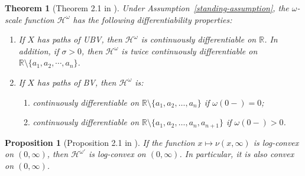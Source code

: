 \documentclass[11pt,reqno]{amsart}
\newtheorem{theorem}{Theorem}[section]
\newtheorem{proposition}{Proposition}[section]
\newtheorem{remark}{Remark}[section]
\newcommand{\reals}{\mathbb{R}}
\newcommand{\ind}{\mathbf{1}}
\newcommand{\cH}{\mathcal{H}}
\renewcommand{\geq}{\geqslant}
\begin{document}
\begin{theorem}[Theorem 2.1 in \cite{mata-renaud_2024}]\label{thm:solution-integral-eq}
	Under Assumption~\ref{standing-assumption}, the $\omega$-scale function $\cH^{\omega}$ has the following differentiability properties:
	\begin{enumerate}
		\item If $X$ has paths of UBV, then $\cH^{\omega}$ is continuously differentiable on $\reals$. In addition, if $\sigma >0$, then $\cH^{\omega}$ is twice continuously differentiable on $\reals \setminus \{a_1,a_2,\cdots,a_n\}$.
		\item If $X$ has paths of BV, then $\cH^{\omega}$ is:
		\begin{enumerate}
			\item continuously differentiable on $\reals \setminus \{a_1, a_2, \dots, a_n\}$ if $\omega(0-)=0$;
			\item continuously differentiable on $\reals \setminus \{a_1, a_2, \dots, a_n,a_{n+1}\}$ if $\omega(0-)>0$.
		\end{enumerate}
	\end{enumerate}
\end{theorem}

\begin{proposition}[Proposition 2.1 in \cite{mata-renaud_2024}]\label{prop:log-convex-general}
	If the function $x \mapsto \nu(x,\infty)$ is log-convex on $(0,\infty)$, then $\mathcal{H}^{\omega \prime}$ is log-convex on $(0,\infty)$. In particular, it is also convex on $(0,\infty)$.
\end{proposition}

%
\end{document}
